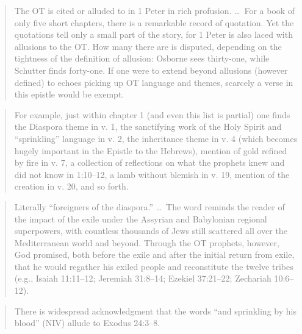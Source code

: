 \begin{quote}
    \textcolor{gray}{%
        The OT is cited or alluded to in 1 Peter in rich profusion. \dots\ For a
        book of only five short chapters, there is a remarkable record of
        quotation. Yet the quotations tell only a small part of the story, for 1
        Peter is also laced with allusions to the OT\@. How many there are is
        disputed, depending on the tightness of the definition of allusion:
        Osborne sees thirty-one, while Schutter finds forty-one. If one were to
        extend beyond allusions (however defined) to echoes picking up OT
        language and themes, scarcely a verse in this epistle would be exempt.
        \autocite[1015]{carson:2007}
    }
\end{quote}

\begin{quote}
    \textcolor{gray}{%
        For example, just within chapter 1 (and even this list is partial) one
        finds the Diaspora theme in v. 1, the sanctifying work of the Holy
        Spirit and \enquote{sprinkling} language in v. 2, the inheritance theme
        in v. 4 (which becomes hugely important in the Epistle to the Hebrews),
        mention of gold refined by fire in v. 7, a collection of reflections on
        what the prophets knew and did not know in 1:10–12, a lamb without
        blemish in v. 19, mention of the creation in v. 20, and so forth.
        \autocite[1015]{carson:2007}
    }
\end{quote}

\begin{quote}
    \textcolor{gray}{%
        Literally \enquote{foreigners of the diaspora.} \dots\ The word reminds
        the reader of the impact of the exile under the Assyrian and Babylonian
        regional superpowers, with countless thousands of Jews still scattered
        all over the Mediterranean world and beyond. Through the OT prophets,
        however, God promised, both before the exile and after the initial
        return from exile, that he would regather his exiled people and
        reconstitute the twelve tribes (e.g., Isaiah 11:11--12; Jeremiah
        31:8--14; Ezekiel 37:21--22; Zechariah 10:6--12).
        \autocite[1015--1016]{carson:2007}
    }
\end{quote}

\begin{quote}
    \textcolor{gray}{%
        There is widespread acknowledgment that the words \enquote{and
        sprinkling by his blood} (NIV) allude to Exodus 24:3--8.
        \autocite[1016]{carson:2007}
    }
\end{quote}

